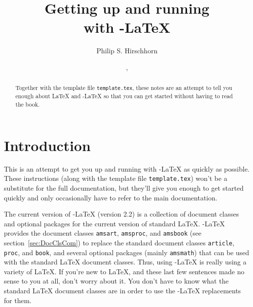 \documentclass{amsart}
\numberwithin{equation}{section}
\theoremstyle{plain} %
\theoremstyle{definition}
\theoremstyle{remark}
\begin{document}
\title[Running \AmS-\LaTeX]{Getting up and running\\
                            with \AmS-\LaTeX}

\author{Philip S. Hirschhorn}

\address{Department of Mathematics\\
         Wellesley College\\
         Wellesley, Massachusetts 02481}


\date{\filedate, \fileversion}

\begin{abstract}
  Together with the template file \texttt{template.tex}, these notes
  are an attempt to tell you enough about \LaTeX{} and \AmS-\LaTeX{}
  so that you can get started without having to read the book.
\end{abstract}

\maketitle

\tableofcontents
\section{Introduction}

This is an attempt to get you up and running with \AmS-\LaTeX{} as
quickly as possible.  These instructions (along with the template file
\texttt{template.tex}) won't be a substitute for the full
documentation, but they'll give you enough to get started quickly and
only occasionally have to refer to the main documentation.

The current version of \AmS-\LaTeX{} (version 2.2) is a collection of
document classes and optional packages for the current version of
standard \LaTeX.  \AmS-\LaTeX{} provides the document classes
\texttt{amsart}, \texttt{amsproc}, and \texttt{amsbook} (see
section~\ref{sec:DocClsCom}) to replace the standard document classes
\texttt{article}, \texttt{proc}, and \texttt{book}, and several
optional packages (mainly \texttt{amsmath}) that can be used with the
standard \LaTeX{} document classes.  Thus, using \AmS-\LaTeX{} is
really using a variety of \LaTeX.  If you're new to \LaTeX{}, and
these last few sentences made no sense to you at all, don't worry
about it.  You don't have to know what the standard \LaTeX{} document
classes are in order to use the \AmS-\LaTeX{} replacements for them.
\end{document}
